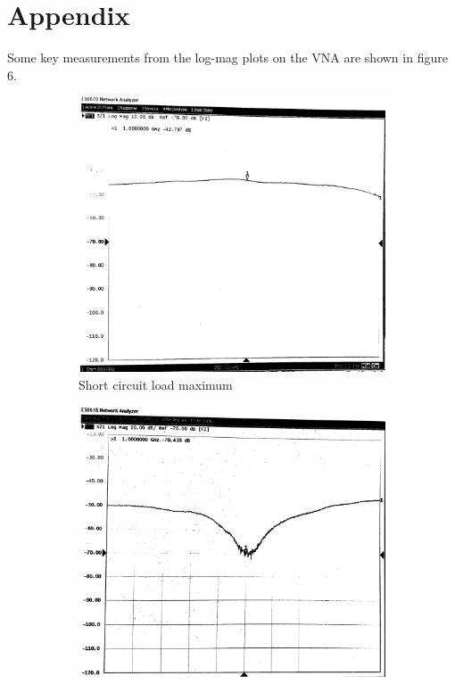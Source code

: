 \documentclass[10pt]{article}
\begin{document}
\section{Appendix}

Some key measurements from the log-mag plots on the VNA are shown in figure 6.

\begin{figure}[ht]
  \centering
  \begin{subfigure}[b]{0.45\textwidth}
      \includegraphics[width=\textwidth]{../photos/lab2/short-cir-peak.jpg}
      \caption{Short circuit load maximum}
  \end{subfigure}
  \quad
  \begin{subfigure}[b]{0.45\textwidth}
      \includegraphics[width=\textwidth]{../photos/lab2/short-cir-valley.jpg}

\end{subfigure}
\end{figure}
\end{document}
